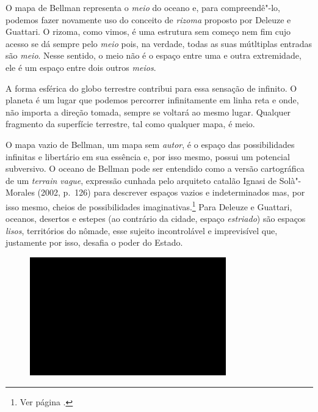 O mapa de Bellman representa o \emph{meio} do oceano e, para
compreendê"-lo, podemos fazer novamente uso do conceito de \emph{rizoma}
proposto por Deleuze e Guattari. O rizoma, como vimos, é uma estrutura
sem começo nem fim cujo acesso se dá sempre pelo \emph{meio} pois, na
verdade, todas as suas mútltiplas entradas são \emph{meio}. Nesse
sentido, o meio não é o espaço entre uma e outra extremidade, ele é um
espaço entre dois outros \emph{meios}.

A forma esférica do globo terrestre contribui para essa sensação de
infinito. O planeta é um lugar que podemos percorrer infinitamente em
linha reta e onde, não importa a direção tomada, sempre se voltará ao
mesmo lugar. Qualquer fragmento da superfície terrestre, tal como
qualquer mapa, é meio.

O mapa vazio de Bellman, um mapa sem \emph{autor}, é o espaço das
possibilidades infinitas e libertário em sua essência e, por isso mesmo,
possui um potencial subversivo. O oceano de Bellman pode ser entendido
como a versão cartográfica de um \emph{terrain vague}, expressão cunhada
pelo arquiteto catalão Ignasi de Solà"-Morales (2002, p.~126) para descrever espaços vazios e indeterminados mas, por isso
mesmo, cheios de possibilidades imaginativas.\footnote{Ver página \pageref{vague}.} Para Deleuze e Guattari, oceanos, desertos e estepes (ao contrário da cidade, espaço \emph{estriado}) são espaços \emph{lisos}, territórios do nômade, esse sujeito incontrolável e imprevisível que, justamente por isso, desafia o poder do Estado.

\begin{figure}[!ht]

\centering
 \includegraphics[width=85mm]{./imgs/im1.jpg}
\caption{\tiny{}}

\end{figure}


